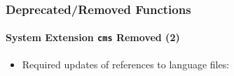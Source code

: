 
\begin{frame}[fragile]
	\frametitle{Deprecated/Removed Functions}
	\framesubtitle{System Extension \texttt{cms} Removed (2)}

	\lstset{basicstyle=\tiny\ttfamily}

	\begin{itemize}

		\item Required updates of references to language files:



\end{itemize}
\end{frame}

